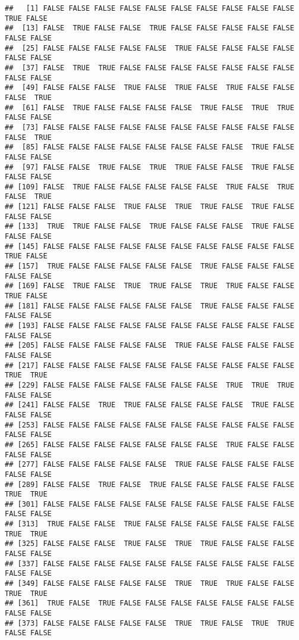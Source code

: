 \documentclass[
]{book}
\begin{document}
\begin{verbatim}
##   [1] FALSE FALSE FALSE FALSE FALSE FALSE FALSE FALSE FALSE FALSE  TRUE FALSE
##  [13] FALSE  TRUE FALSE FALSE  TRUE FALSE FALSE FALSE FALSE FALSE FALSE FALSE
##  [25] FALSE FALSE FALSE FALSE FALSE  TRUE FALSE FALSE FALSE FALSE FALSE FALSE
##  [37] FALSE  TRUE  TRUE FALSE FALSE FALSE FALSE FALSE FALSE FALSE FALSE FALSE
##  [49] FALSE FALSE FALSE  TRUE FALSE  TRUE FALSE  TRUE FALSE FALSE FALSE  TRUE
##  [61] FALSE  TRUE FALSE FALSE FALSE FALSE  TRUE FALSE  TRUE  TRUE FALSE FALSE
##  [73] FALSE FALSE FALSE FALSE FALSE FALSE FALSE FALSE FALSE FALSE FALSE  TRUE
##  [85] FALSE FALSE FALSE FALSE FALSE FALSE FALSE FALSE  TRUE FALSE FALSE FALSE
##  [97] FALSE FALSE  TRUE FALSE  TRUE  TRUE FALSE FALSE  TRUE FALSE FALSE FALSE
## [109] FALSE  TRUE FALSE FALSE FALSE FALSE FALSE  TRUE FALSE  TRUE FALSE  TRUE
## [121] FALSE FALSE FALSE  TRUE FALSE  TRUE  TRUE FALSE  TRUE FALSE FALSE FALSE
## [133]  TRUE  TRUE FALSE FALSE  TRUE FALSE FALSE FALSE  TRUE FALSE FALSE FALSE
## [145] FALSE FALSE FALSE FALSE FALSE FALSE FALSE FALSE FALSE FALSE  TRUE FALSE
## [157]  TRUE FALSE FALSE FALSE FALSE FALSE  TRUE FALSE FALSE FALSE FALSE FALSE
## [169] FALSE  TRUE FALSE  TRUE  TRUE FALSE  TRUE  TRUE FALSE FALSE  TRUE FALSE
## [181] FALSE FALSE FALSE FALSE FALSE FALSE  TRUE FALSE FALSE FALSE FALSE FALSE
## [193] FALSE FALSE FALSE FALSE FALSE FALSE FALSE FALSE FALSE FALSE FALSE FALSE
## [205] FALSE FALSE FALSE FALSE FALSE  TRUE FALSE FALSE FALSE FALSE FALSE FALSE
## [217] FALSE FALSE FALSE FALSE FALSE FALSE FALSE FALSE FALSE FALSE  TRUE  TRUE
## [229] FALSE FALSE FALSE FALSE FALSE FALSE FALSE  TRUE  TRUE  TRUE FALSE FALSE
## [241] FALSE FALSE  TRUE  TRUE FALSE FALSE FALSE FALSE  TRUE FALSE FALSE FALSE
## [253] FALSE FALSE FALSE FALSE FALSE FALSE FALSE FALSE FALSE FALSE FALSE FALSE
## [265] FALSE FALSE FALSE FALSE FALSE FALSE FALSE  TRUE FALSE FALSE FALSE FALSE
## [277] FALSE FALSE FALSE FALSE FALSE  TRUE FALSE FALSE FALSE FALSE FALSE FALSE
## [289] FALSE FALSE  TRUE FALSE  TRUE FALSE FALSE FALSE FALSE FALSE  TRUE  TRUE
## [301] FALSE FALSE FALSE FALSE FALSE FALSE FALSE FALSE FALSE FALSE FALSE FALSE
## [313]  TRUE FALSE FALSE  TRUE FALSE FALSE FALSE FALSE FALSE FALSE  TRUE  TRUE
## [325] FALSE FALSE FALSE  TRUE FALSE  TRUE  TRUE FALSE FALSE FALSE FALSE FALSE
## [337] FALSE FALSE FALSE FALSE FALSE FALSE FALSE FALSE FALSE FALSE FALSE FALSE
## [349] FALSE FALSE FALSE FALSE FALSE  TRUE  TRUE  TRUE FALSE FALSE  TRUE  TRUE
## [361]  TRUE FALSE  TRUE FALSE FALSE FALSE FALSE FALSE FALSE FALSE FALSE FALSE
## [373] FALSE FALSE FALSE FALSE FALSE  TRUE  TRUE FALSE  TRUE  TRUE FALSE FALSE

\end{verbatim}
\end{document}
